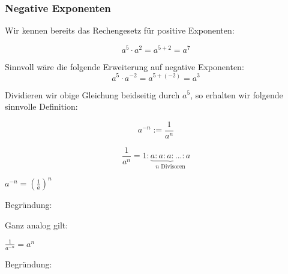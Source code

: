 \subsubsection{Negative Exponenten}
Wir kennen bereits das Rechengesetz für positive Exponenten:

$$a^5\cdot{}a^2 = a^{5+2} = a^7$$

Sinnvoll wäre die folgende Erweiterung auf negative
Exponenten:\\
$$a^5\cdot{}a^{-2} = a^{5+(-2)} = a^3$$

Dividieren wir obige Gleichung beidseitig durch $a^5$, so erhalten wir
folgende sinnvolle Definition:


\begin{definition}{}{}
$$a^{-n} := \frac{1}{a^n}$$
\end{definition}

\begin{bemerkung}{}{}
$$\frac{1}{a^n}= 1 : \underbrace{a : a : a : ... : a}_{n \textrm{\ Divisoren}}$$
\end{bemerkung}

\begin{gesetz}{}{}
$a^{-n} = \left(\frac1a\right)^n$
\end{gesetz}
Begründung:

\newpage
Ganz analog gilt:

\begin{gesetz}{}{}
$\frac{1}{a^{-n}} =a^n$
\end{gesetz}
Begründung:



